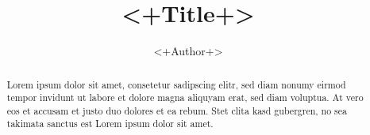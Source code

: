 \documentclass[a4paper,titlepage]{article}
\begin{document}
	\title{<+Title+>}
	\author{<+Author+>}
	\maketitle

	\begin{abstract}

	Lorem ipsum dolor sit amet, consetetur sadipscing elitr, sed diam nonumy eirmod
	tempor invidunt ut labore et dolore magna aliquyam erat, sed diam voluptua. At
	vero eos et accusam et justo duo dolores et ea rebum. Stet clita kasd gubergren,
	no sea takimata sanctus est Lorem ipsum dolor sit amet.

	\end{abstract}

	\tableofcontents
	\listoftables
	\listoffigures

	\pagebreak


\end{document}
